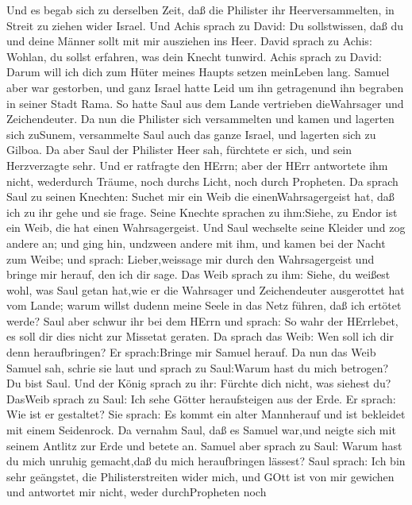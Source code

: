  Und es begab sich zu derselben Zeit, daß die Philister ihr
Heerversammelten, in Streit zu ziehen wider Israel. Und Achis sprach zu
David: Du sollstwissen, daß du und deine Männer sollt mit mir ausziehen
ins Heer.  David sprach zu Achis: Wohlan, du sollst
erfahren, was dein Knecht tunwird. Achis sprach zu David: Darum will ich
dich zum Hüter meines Haupts setzen meinLeben lang.  Samuel
aber war gestorben, und ganz Israel hatte Leid um ihn getragenund ihn
begraben in seiner Stadt Rama. So hatte Saul aus dem Lande vertrieben
dieWahrsager und Zeichendeuter.  Da nun die Philister sich
versammelten und kamen und lagerten sich zuSunem, versammelte Saul auch
das ganze Israel, und lagerten sich zu Gilboa.  Da aber Saul
der Philister Heer sah, fürchtete er sich, und sein Herzverzagte sehr.
 Und er ratfragte den HErrn; aber der HErr antwortete ihm
nicht, wederdurch Träume, noch durchs Licht, noch durch Propheten.
 Da sprach Saul zu seinen Knechten: Suchet mir ein Weib die
einenWahrsagergeist hat, daß ich zu ihr gehe und sie frage. Seine
Knechte sprachen zu ihm:Siehe, zu Endor ist ein Weib, die hat einen
Wahrsagergeist.  Und Saul wechselte seine Kleider und zog
andere an; und ging hin, undzween andere mit ihm, und kamen bei der
Nacht zum Weibe; und sprach: Lieber,weissage mir durch den
Wahrsagergeist und bringe mir herauf, den ich dir sage.  Das
Weib sprach zu ihm: Siehe, du weißest wohl, was Saul getan hat,wie er
die Wahrsager und Zeichendeuter ausgerottet hat vom Lande; warum willst
dudenn meine Seele in das Netz führen, daß ich ertötet werde?
 Saul aber schwur ihr bei dem HErrn und sprach: So wahr der
HErrlebet, es soll dir dies nicht zur Missetat geraten.  Da
sprach das Weib: Wen soll ich dir denn heraufbringen? Er sprach:Bringe
mir Samuel herauf.  Da nun das Weib Samuel sah, schrie sie
laut und sprach zu Saul:Warum hast du mich betrogen? Du bist Saul.
 Und der König sprach zu ihr: Fürchte dich nicht, was
siehest du? DasWeib sprach zu Saul: Ich sehe Götter heraufsteigen aus
der Erde.  Er sprach: Wie ist er gestaltet? Sie sprach: Es
kommt ein alter Mannherauf und ist bekleidet mit einem Seidenrock. Da
vernahm Saul, daß es Samuel war,und neigte sich mit seinem Antlitz zur
Erde und betete an.  Samuel aber sprach zu Saul: Warum hast
du mich unruhig gemacht,daß du mich heraufbringen lässest? Saul sprach:
Ich bin sehr geängstet, die Philisterstreiten wider mich, und GOtt ist
von mir gewichen und antwortet mir nicht, weder durchPropheten noch
